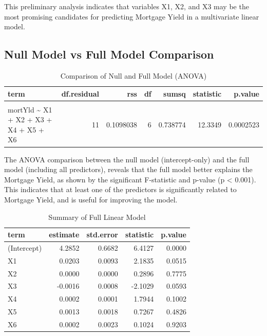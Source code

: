 \documentclass[
  11pt,
]{article}
\begin{document}
This preliminary analysis indicates that variables X1, X2, and X3 may be
the most promising candidates for predicting Mortgage Yield in a
multivariate linear model.

\subsection{Null Model vs Full Model
Comparison}\label{null-model-vs-full-model-comparison}

\begingroup\fontsize{8}{10}\selectfont

\begin{longtable}[t]{lrrrrrr}
\caption{\label{tab:unnamed-chunk-9}Comparison of Null and Full Model (ANOVA)}\\
\toprule
term & df.residual & rss & df & sumsq & statistic & p.value\\
\midrule
\cellcolor{gray!10}{mortYld \textasciitilde{} 1} & \cellcolor{gray!10}{17} & \cellcolor{gray!10}{0.8485778} & \cellcolor{gray!10}{NA} & \cellcolor{gray!10}{NA} & \cellcolor{gray!10}{NA} & \cellcolor{gray!10}{NA}\\
mortYld \textasciitilde{} X1 + X2 + X3 + X4 + X5 + X6 & 11 & 0.1098038 & 6 & 0.738774 & 12.3349 & 0.0002523\\
\bottomrule
\end{longtable}
\endgroup{}

The ANOVA comparison between the null model (intercept-only) and the
full model (including all predictors), reveals that the full model
better explains the Mortgage Yield, as shown by the significant
F-statistic and p-value (p \textless{} 0.001). This indicates that at
least one of the predictors is significantly related to Mortgage Yield,
and is useful for improving the model.

\begin{table}[!h]
\centering
\caption{\label{tab:unnamed-chunk-10}Summary of Full Linear Model}
\centering
\fontsize{8}{10}\selectfont
\begin{tabular}[t]{lrrrr}
\toprule
term & estimate & std.error & statistic & p.value\\
\midrule
(Intercept) & 4.2852 & 0.6682 & 6.4127 & 0.0000\\
X1 & 0.0203 & 0.0093 & 2.1835 & 0.0515\\
X2 & 0.0000 & 0.0000 & 0.2896 & 0.7775\\
X3 & -0.0016 & 0.0008 & -2.1029 & 0.0593\\
X4 & 0.0002 & 0.0001 & 1.7944 & 0.1002\\
\addlinespace
X5 & 0.0013 & 0.0018 & 0.7267 & 0.4826\\
X6 & 0.0002 & 0.0023 & 0.1024 & 0.9203\\
\bottomrule
\end{tabular}
\end{table}
\end{document}
